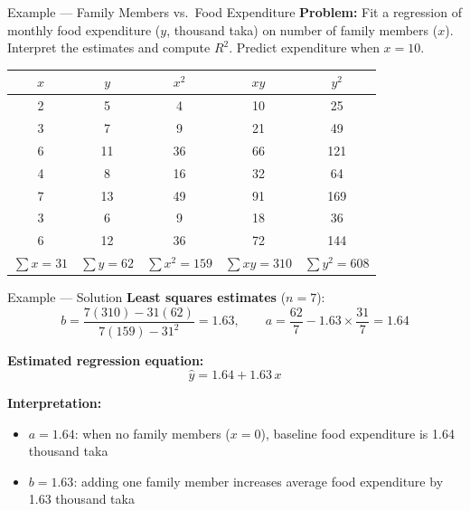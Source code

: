\documentclass[12pt, aspectratio=169]{beamer}
\begin{document}
    \begin{frame}{Example --- Family Members vs.\ Food Expenditure}
        \textbf{Problem:} Fit a regression of monthly food expenditure ($y$, thousand taka) on number of family members ($x$). Interpret the estimates and compute $R^2$.  Predict expenditure when $x = 10$.

        \begin{center}
            \small
            \begin{tabular}{ccccc}
                \toprule
                $x$ & $y$ & $x^2$ & $xy$ & $y^2$ \\
                \midrule
                2 & 5  & 4  & 10 & 25  \\
                3 & 7  & 9  & 21 & 49  \\
                6 & 11 & 36 & 66 & 121 \\
                4 & 8  & 16 & 32 & 64  \\
                7 & 13 & 49 & 91 & 169 \\
                3 & 6  & 9  & 18 & 36  \\
                6 & 12 & 36 & 72 & 144 \\
                \midrule
                $\sum x = 31$ & $\sum y = 62$ & $\sum x^2 = 159$ &
                $\sum xy = 310$ & $\sum y^2 = 608$ \\
                \bottomrule
            \end{tabular}
        \end{center}
    \end{frame}


    \begin{frame}{Example --- Solution}
        \textbf{Least squares estimates} ($n = 7$):
        \[
            b = \frac{7(310) - 31(62)}{7(159) - 31^2} = 1.63,
            \qquad
            a = \frac{62}{7} - 1.63 \times \frac{31}{7} = 1.64
        \]

        \textbf{Estimated regression equation:}
        \[
            \hat{y} = 1.64 + 1.63\,x
        \]

        \textbf{Interpretation:}
        \begin{itemize}
            \item $a = 1.64$: when no family members ($x=0$), baseline food expenditure is 1.64 thousand taka
            \item $b = 1.63$: adding one family member increases average food expenditure by 1.63 thousand taka
        \end{itemize}
    \end{frame}
\end{document}
